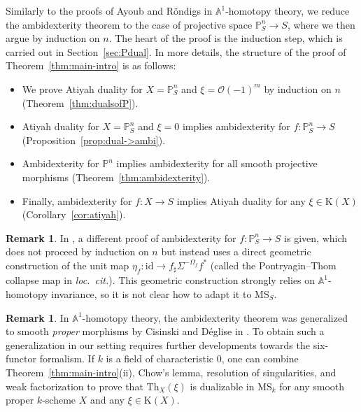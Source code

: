 \documentclass{amsart}
\numberwithin{equation}{section}
\theoremstyle{plain}
\theoremstyle{definition}
\newtheorem{remark}[equation]{Remark}
\let\scr=\mathcal
\let\bb=\mathbb
\def\A{\bb A}
\def\P{\bb P}
\def\id{\mathrm{id}}
\def\Th{\mathrm{Th}}
\def\K{\mathrm{K}{}}
\def\MS{\mathrm{MS}}
\begin{document}
Similarly to the proofs of Ayoub and Röndigs in $\A^1$-homotopy theory, we reduce the ambidexterity theorem to the case of projective space $\P^n_S\to S$, where we then argue by induction on $n$. 
The heart of the proof is the induction step, which is carried out in Section~\ref{sec:Pdual}. In more details, the structure of the proof of Theorem~\ref{thm:main-intro} is as follows:
\begin{itemize}
	\item We prove Atiyah duality for $X=\P^n_S$ and $\xi=\scr O(-1)^m$ by induction on $n$ (Theorem~\ref{thm:dualsofP}).
	\item Atiyah duality for $X=\P^n_S$ and $\xi=0$ implies ambidexterity for $f\colon \P^n_S\to S$ (Proposition~\ref{prop:dual->ambi}).
	\item Ambidexterity for $\P^n$ implies ambidexterity for all smooth projective morphisms (Theorem~\ref{thm:ambidexterity}).
	\item Finally, ambidexterity for $f\colon X\to S$ implies Atiyah duality for any $\xi\in\K(X)$ (Corollary~\ref{cor:atiyah}).
\end{itemize}

\begin{remark}
	In \cite[Section 5.3]{hoyois-sixops}, a different proof of ambidexterity for $f\colon \P^n_S\to S$ is given, which does not proceed by induction on $n$ but instead uses a direct geometric construction of the unit map $\eta_f\colon \id\to f_\sharp\Sigma^{-\Omega_f}f^*$ (called the Pontryagin–Thom collapse map in \emph{loc.\ cit.}).
	This geometric construction strongly relies on $\A^1$-homotopy invariance, so it is not clear how to adapt it to $\MS_S$.
\end{remark}

\begin{remark}
	In $\A^1$-homotopy theory, the ambidexterity theorem was generalized to smooth \emph{proper} morphisms by Cisinski and Déglise in \cite{CD}.
	To obtain such a generalization in our setting requires further developments towards the six-functor formalism. If $k$ is a field of characteristic $0$, one can combine Theorem~\ref{thm:main-intro}(ii), Chow's lemma, resolution of singularities, and weak factorization to prove that $\Th_X(\xi)$ is dualizable in $\MS_k$ for any smooth proper $k$-scheme $X$ and any $\xi\in\K(X)$.
\end{remark}
\end{document}
